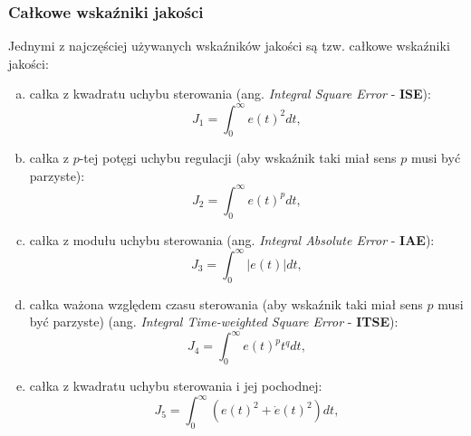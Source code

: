 \documentclass{article}
\begin{document}
        \subsubsection{Całkowe wskaźniki jakości}
        Jednymi z najczęściej używanych wskaźników jakości są tzw. całkowe wskaźniki jakości:
        \begin{enumerate}[(a)]
            \item całka z kwadratu uchybu sterowania (ang. \textit{Integral
            Square Error} - \textbf{ISE}):
                \begin{equation}
                    \label{eq:j1}
                    J_{1} = \int_{0}^{\infty}{e(t)^{2}dt},
                \end{equation}
    
            \item całka z $p$-tej potęgi uchybu regulacji (aby wskaźnik taki miał sens $p$ musi być parzyste):
                \begin{equation}
                    \label{eq:j2}
                    J_{2} = \int_{0}^{\infty}{e(t)^{p}dt},
                \end{equation}
    
            \item całka z modułu uchybu sterowania (ang. \textit{Integral Absolute Error} - \textbf{IAE}):
                \begin{equation}
                    \label{eq:j3}
                    J_{3} = \int_{0}^{\infty}{|e(t)|dt},
                \end{equation}
    
            \item całka ważona względem czasu sterowania (aby wskaźnik taki miał
            sens $p$ musi być parzyste) (ang. \textit{Integral Time-weighted Square Error} - \textbf{ITSE}):
                \begin{equation}
                    \label{eq:j4}
                    J_{4} = \int_{0}^{\infty}{e(t)^{p}t^{q}dt},
                \end{equation}
    
            \item całka z kwadratu uchybu sterowania i jej pochodnej:
                \begin{equation}
                    \label{eq:j5}
                    J_{5} = \int_{0}^{\infty}{\left(e(t)^{2} + \dot{e}(t)^{2}\right)dt},
                \end{equation}
    

\end{enumerate}
\end{document}
